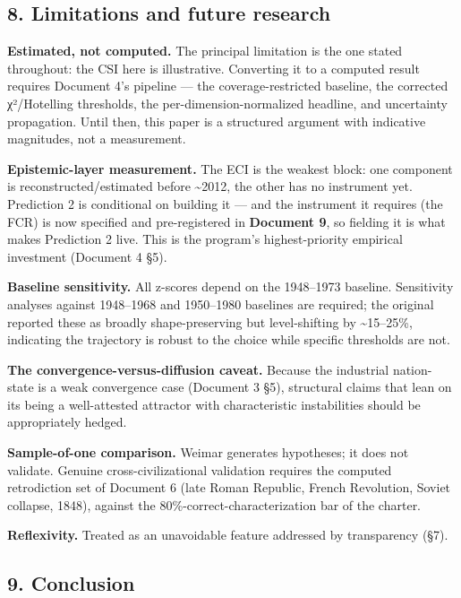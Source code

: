 \documentclass[
]{article}
\begin{document}
\subsection{8. Limitations and future
research}\label{limitations-and-future-research}

\textbf{Estimated, not computed.} The principal limitation is the one
stated throughout: the CSI here is illustrative. Converting it to a
computed result requires Document 4's pipeline --- the
coverage-restricted baseline, the corrected χ²/Hotelling thresholds, the
per-dimension-normalized headline, and uncertainty propagation. Until
then, this paper is a structured argument with indicative magnitudes,
not a measurement.

\textbf{Epistemic-layer measurement.} The ECI is the weakest block: one
component is reconstructed/estimated before \textasciitilde2012, the
other has no instrument yet. Prediction 2 is conditional on building it
--- and the instrument it requires (the FCR) is now specified and
pre-registered in \textbf{Document 9}, so fielding it is what makes
Prediction 2 live. This is the program's highest-priority empirical
investment (Document 4 §5).

\textbf{Baseline sensitivity.} All z-scores depend on the 1948--1973
baseline. Sensitivity analyses against 1948--1968 and 1950--1980
baselines are required; the original reported these as broadly
shape-preserving but level-shifting by \textasciitilde15--25\%,
indicating the trajectory is robust to the choice while specific
thresholds are not.

\textbf{The convergence-versus-diffusion caveat.} Because the industrial
nation-state is a weak convergence case (Document 3 §5), structural
claims that lean on its being a well-attested attractor with
characteristic instabilities should be appropriately hedged.

\textbf{Sample-of-one comparison.} Weimar generates hypotheses; it does
not validate. Genuine cross-civilizational validation requires the
computed retrodiction set of Document 6 (late Roman Republic, French
Revolution, Soviet collapse, 1848), against the
80\%-correct-characterization bar of the charter.

\textbf{Reflexivity.} Treated as an unavoidable feature addressed by
transparency (§7).

\subsection{9. Conclusion}\label{conclusion}
\end{document}
